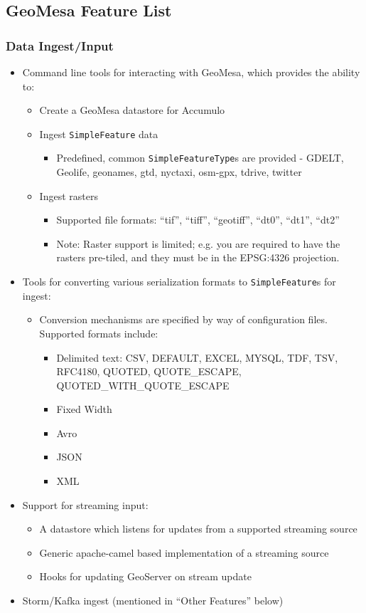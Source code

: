 \subsection{GeoMesa Feature List}
\label{appendix:features:geomesa}

\subsubsection*{Data Ingest/Input}

\begin{itemize}
\item{Command line tools for interacting with GeoMesa, which provides the ability to:
  \begin{itemize}
  \item Create a GeoMesa datastore for Accumulo
  \item{Ingest \texttt{SimpleFeature} data
    \begin{itemize}
    \item Predefined, common \texttt{SimpleFeatureType}s are provided - GDELT, Geolife, geonames, gtd, nyctaxi, osm-gpx, tdrive, twitter
    \end{itemize}
  }
  \item{Ingest rasters
    \begin{itemize}
    \item Supported file formats: ``tif'', ``tiff'', ``geotiff'', ``dt0'', ``dt1'', ``dt2''
    \item Note: Raster support is limited; e.g. you are required to have the rasters pre-tiled, and they must be in the EPSG:4326 projection.
    \end{itemize}
  }
  \end{itemize}
}
\item{Tools for converting various serialization formats to \texttt{SimpleFeature}s for ingest:
  \begin{itemize}
  \item{Conversion mechanisms are specified by way of configuration files.  Supported formats include:
    \begin{itemize}
    \item Delimited text: CSV, DEFAULT, EXCEL, MYSQL, TDF, TSV, RFC4180, QUOTED, QUOTE\_ESCAPE, QUOTED\_WITH\_QUOTE\_ESCAPE
    \item Fixed Width
    \item Avro
    \item JSON
    \item XML
    \end{itemize}
  }
  \end{itemize}
}
\item{Support for streaming input:
  \begin{itemize}
  \item A datastore which listens for updates from a supported streaming source
  \item Generic apache-camel based implementation of a streaming source
  \item Hooks for updating GeoServer on stream update
  \end{itemize}
}
\item Storm/Kafka ingest (mentioned in ``Other Features'' below)
\end{itemize}


